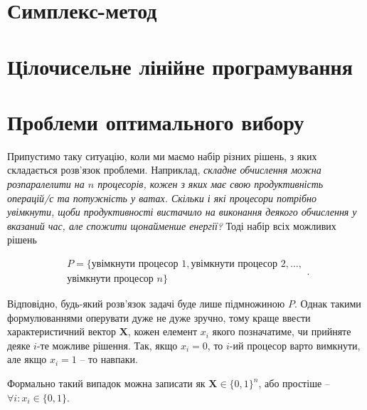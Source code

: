 \documentclass[\main/book.tex]{subfiles}
\begin{document}
\section{Симплекс-метод}
\label{section:linear:simplex}

\section{Цілочисельне лінійне програмування}
\label{section:linear:integer}

\section{Проблеми оптимального вибору}
\label{section:linear:x_in_0-1}

Припустимо таку ситуацію, коли ми маємо набір різних рішень, з яких складається розв'язок проблеми. Наприклад, \textit{складне обчислення можна розпаралелити на $n$ процесорів, кожен з яких має свою продуктивність операцій/с та потужність у ватах. Скільки і які процесори потрібно увімкнути, щоби продуктивності вистачило на виконання деякого обчислення у вказаний час, але спожити щонайменше енергії?} Тоді набір всіх можливих рішень

\[
\begin{split}
P = \{
 \text{увімкнути процесор 1},
 \text{увімкнути процесор 2},
 \ldots, \\
 \text{увімкнути процесор $n$}
\}
\end{split}
.
\]

Відповідно, будь-який розв'язок задачі буде лише підмножиною $P$. Однак такими формулюваннями оперувати дуже не дуже зручно, тому краще ввести характеристичний вектор $\mathbf{X}$, кожен елемент $x_i$ якого позначатиме, чи прийняте деяке $i$-те можливе рішення. Так, якщо $x_i=0$, то $i$-ий процесор варто вимкнути, але якщо $x_i=1$ -- то навпаки.

\begin{note}
 Формально такий випадок можна записати як $\mathbf{X} \in \{0, 1\}^{n}$, або простіше -- $\forall i: x_i \in \{0, 1\}$.
\end{note}
\end{document}
